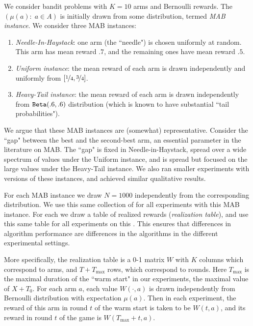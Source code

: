 \documentclass[../competing_bandits.tex]{subfiles}
\begin{document}

We consider bandit problems with $K=10$ arms and Bernoulli rewards. The \emph{\MRV} $(\mu(a):\; a\in A)$ is initially drawn from some distribution, termed \emph{MAB instance}. We consider three MAB instances:
\begin{enumerate}
\item \emph{Needle-In-Haystack}: one arm (the ``needle") is chosen uniformly at random. This arm has mean reward $.7$, and the remaining ones have mean reward $.5$.

\item \emph{Uniform instance}: the mean reward of each arm is drawn independently and uniformly from $[\nicefrac{1}{4}, \nicefrac{3}{4}]$.
\item \emph{Heavy-Tail instance}: the mean reward of each arm is drawn independently from $\mathtt{Beta}(.6,.6)$ distribution (which is known to have substantial ``tail probabilities").
\end{enumerate}
We argue that these MAB instances are (somewhat) representative. Consider the ``gap" between the best and the second-best arm, an essential parameter in the literature on MAB. The ``gap" is fixed in Needle-in-Haystack, spread over a wide spectrum of values under the Uniform instance, and is spread but  focused on the large values under the Heavy-Tail instance. We also ran smaller experiments with versions of these instances, and achieved similar qualitative results.

For each MAB instance we draw $N = 1000$ \MRVs independently from the corresponding distribution. We use this same collection of \MRVs for all experiments with this MAB instance. For each \MRV we draw a table of realized rewards (\emph{realization table}), and use this same table for all experiments on this \MRV. This ensures that differences in algorithm performance are  differences in the algorithms in the different experimental settings.

More specifically, the realization table is a 0-1 matrix $W$ with $K$ columns which correspond to arms, and $T+T_{\max}$ rows, which correspond to rounds. Here $T_{\max}$ is the maximal duration of the ``warm start" in our experiments, \ie the maximal value of $X+T_0$. For each arm $a$, each value $W(\cdot,a)$ is drawn independently from Bernoulli distribution with expectation $\mu(a)$. Then in each experiment, the reward of this arm in round $t$ of the warm start is taken to be $W(t,a)$, and its reward in round $t$ of the game is $W(T_{\max}+t,a)$.
\end{document}
